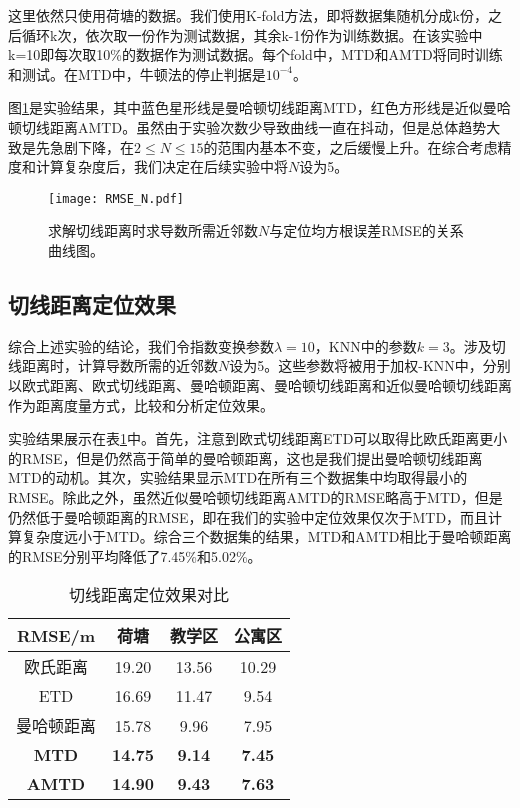 这里依然只使用荷塘的数据。我们使用K-fold方法，即将数据集随机分成k份，之后循环k次，依次取一份作为测试数据，其余k-1份作为训练数据。在该实验中k=10即每次取10\%的数据作为测试数据。每个fold中，MTD和AMTD将同时训练和测试。在MTD中，牛顿法的停止判据是$10^{-4}$。

图\ref{fig:rmse_n}是实验结果，其中蓝色星形线是曼哈顿切线距离MTD，红色方形线是近似曼哈顿切线距离AMTD。虽然由于实验次数少导致曲线一直在抖动，但是总体趋势大致是先急剧下降，在$2 \le N \le 15$的范围内基本不变，之后缓慢上升。在综合考虑精度和计算复杂度后，我们决定在后续实验中将$N$设为5。

\begin{figure}[htb]
	\centering
	\texttt{[image: RMSE\_N.pdf]}
	\caption{求解切线距离时求导数所需近邻数$N$与定位均方根误差RMSE的关系曲线图。}
	\label{fig:rmse_n}
\end{figure}

\subsection{切线距离定位效果}

综合上述实验的结论，我们令指数变换参数$\lambda=10$，KNN中的参数$k=3$。涉及切线距离时，计算导数所需的近邻数$N$设为5。这些参数将被用于加权-KNN中，分别以欧式距离、欧式切线距离、曼哈顿距离、曼哈顿切线距离和近似曼哈顿切线距离作为距离度量方式，比较和分析定位效果。

实验结果展示在表\ref{tab:td}中。首先，注意到欧式切线距离ETD可以取得比欧氏距离更小的RMSE，但是仍然高于简单的曼哈顿距离，这也是我们提出曼哈顿切线距离MTD的动机。其次，实验结果显示MTD在所有三个数据集中均取得最小的RMSE。除此之外，虽然近似曼哈顿切线距离AMTD的RMSE略高于MTD，但是仍然低于曼哈顿距离的RMSE，即在我们的实验中定位效果仅次于MTD，而且计算复杂度远小于MTD。综合三个数据集的结果，MTD和AMTD相比于曼哈顿距离的RMSE分别平均降低了7.45\%和5.02\%。

\begin{table}[htb]
	\caption{切线距离定位效果对比}
	\begin{center}
		\begin{tabular}{cccc}
			\toprule
			RMSE/m &  荷塘 & 教学区 & 公寓区 \\
			\midrule
			欧氏距离 & 19.20 & 13.56 & 10.29 \\
			\midrule
			ETD & 16.69 & 11.47 & 9.54 \\
			\midrule
			曼哈顿距离 & 15.78 & 9.96 & 7.95 \\
			\midrule
			\textbf{MTD} & \textbf{14.75} & \textbf{9.14} & \textbf{7.45} \\
			\midrule
			\textbf{AMTD} & \textbf{14.90} & \textbf{9.43} & \textbf{7.63} \\
			\bottomrule
		\end{tabular}
		\label{tab:td}
	\end{center}
\end{table}

